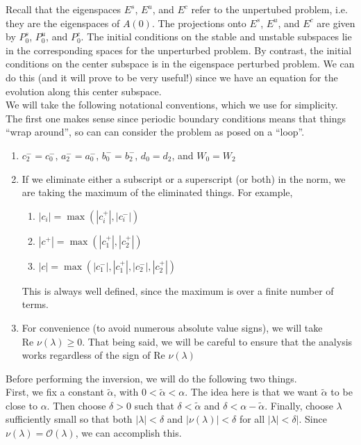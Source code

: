 \documentclass[12pt]{article}
\begin{document}
Recall that the eigenspaces $E^s$, $E^u$, and $E^c$ refer to the unpertubed problem, i.e. they are the eigenspaces of $A(0)$. The projections onto $E^s$, $E^u$, and $E^c$ are given by $P_0^s$, $P_0^u$, and $P_0^c$. The initial conditions on the stable and unstable subspaces lie in the corresponding spaces for the unperturbed problem. By contrast, the initial conditions on the center subspace is in the eigenspace perturbed problem. We can do this (and it will prove to be very useful!) since we have an equation for the evolution along this center subspace.\\

We will take the following notational conventions, which we use for simplicity. The first one makes sense since periodic boundary conditions means that things ``wrap around'', so can can consider the problem as posed on a ``loop''.

\begin{enumerate}
\item $c_2^- = c_0^-$, $a_2^- = a_0^-$, $b_0^- = b_2^-$, $d_0 = d_2$, and $W_0 = W_2$
\item If we eliminate either a subscript or a superscript (or both) in the norm, we are taking the maximum of the eliminated things. For example,
	\begin{enumerate}
		\item $|c_i| = \max(|c_i^+|, |c_i^-|)$ 
		\item $|c^+| = \max(|c_1^+|, |c_2^+|)$
		\item $|c| = \max(|c_1^-|, |c_1^+|, |c_2^-|, |c_2^+|)$
	\end{enumerate}
	This is always well defined, since the maximum is over a finite number of terms.
\item For convenience (to avoid numerous absolute value signs), we will take $\text{Re }\nu(\lambda) \geq 0$. That being said, we will be careful to ensure that the analysis works regardless of the sign of $\text{Re }\nu(\lambda)$
\end{enumerate}

Before performing the inversion, we will do the following two things.\\

First, we fix a constant $\tilde{\alpha}$, with $0 < \tilde{\alpha} < \alpha$. The idea here is that we want $\tilde{\alpha}$ to be close to $\alpha$. Then choose $\delta> 0$ such that $\delta < \tilde{\alpha}$ and $\delta < \alpha - \tilde{\alpha}$. Finally, choose $\lambda$ sufficiently small so that both $|\lambda| < \delta$ and $|\nu(\lambda)| < \delta$ for all $|\lambda| < \delta|$. Since $\nu(\lambda) = \mathcal{O}(\lambda)$, we can accomplish this. \\
\end{document}
